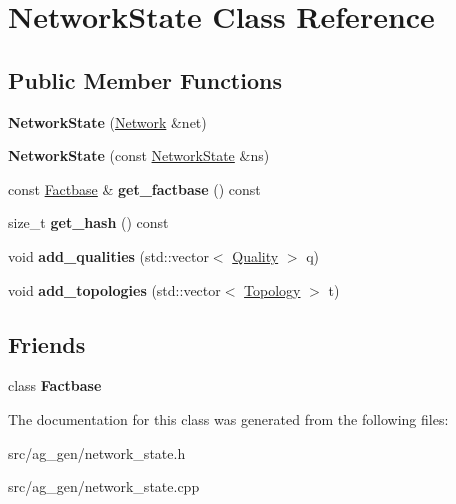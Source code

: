 \hypertarget{class_network_state}{}\section{Network\+State Class Reference}
\label{class_network_state}
\subsection*{Public Member Functions}
\begin{DoxyCompactItemize}
\item 
\mbox{\label{class_network_state_a1ab3020649c595c0158181a8603eceb0}} 
{\bfseries Network\+State} (\mbox{\hyperlink{class_network}{Network}} \&net)
\item 
\mbox{\label{class_network_state_a201b7d2d98d68dac62121243f8a0b78f}} 
{\bfseries Network\+State} (const \mbox{\hyperlink{class_network_state}{Network\+State}} \&ns)
\item 
\mbox{\label{class_network_state_af22d39ca80d818d3c15ff27bf2b9900b}} 
const \mbox{\hyperlink{class_factbase}{Factbase}} \& {\bfseries get\+\_\+factbase} () const
\item 
\mbox{\label{class_network_state_a0ac88601dc6b8263982c6a56c24d250e}} 
size\+\_\+t {\bfseries get\+\_\+hash} () const
\item 
\mbox{\label{class_network_state_ae63be4f6d74a4f6f71da384434dba233}} 
void {\bfseries add\+\_\+qualities} (std\+::vector$<$ \mbox{\hyperlink{class_quality}{Quality}} $>$ q)
\item 
\mbox{\label{class_network_state_a96debade0210181e318f5dcb79847cf9}} 
void {\bfseries add\+\_\+topologies} (std\+::vector$<$ \mbox{\hyperlink{class_topology}{Topology}} $>$ t)
\end{DoxyCompactItemize}
\subsection*{Friends}
\begin{DoxyCompactItemize}
\item 
\mbox{\label{class_network_state_af57acf978b262397fa5d12d64b884bde}} 
class {\bfseries Factbase}
\end{DoxyCompactItemize}


The documentation for this class was generated from the following files\+:\begin{DoxyCompactItemize}
\item 
src/ag\+\_\+gen/network\+\_\+state.\+h\item 
src/ag\+\_\+gen/network\+\_\+state.\+cpp\end{DoxyCompactItemize}
